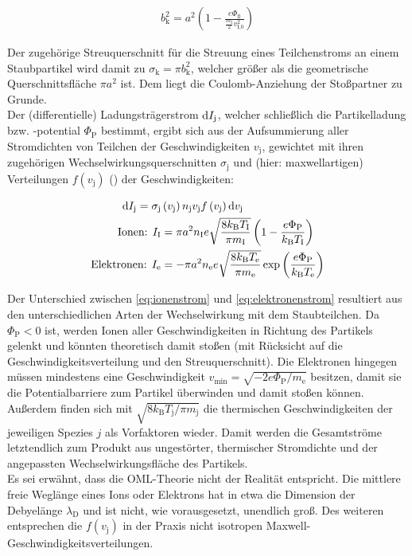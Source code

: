 \documentclass[numbers=noenddot,a4paper,notitlepage,twoside,BCOR15mm]{scrbook}
\newcommand{\diff}{\textnormal{d}}
\newcommand{\ix}[1]{_\text{#1}}
\begin{document}
				\begin{align}
					b\ix{k}^2=a^2\left(1-\frac{e\Phi\ix{fl}}{\frac{m\ix{I}}{2}v\ix{I,0}^2}\right) \label{eq:krit}
				\end{align}

			Der zugehörige Streuquerschnitt für die Streuung eines Teilchenstroms an einem Staubpartikel wird damit zu $\sigma\ix{k}=\pi b\ix{k}^2$, welcher größer als die geometrische Querschnittsfläche $\pi a^2$ ist. Dem liegt die Coulomb-Anziehung der Stoßpartner zu Grunde.\\
			Der (differentielle) Ladungsträgerstrom $\diff I\ix{j}$, welcher schließlich die Partikelladung bzw. -potential $\Phi\ix{P}$ bestimmt, ergibt sich aus der Aufsummierung aller Stromdichten von Teilchen der Geschwindigkeiten $v\ix{j}$, gewichtet mit ihren zugehörigen Wechselwirkungsquerschnitten $\sigma\ix{j}$ und (hier: maxwellartigen) Verteilungen $f\left(v\ix{j}\right)$ (\cite{Melzer12}) der Geschwindigkeiten:

				\begin{align}
					\diff I\ix{j}=\sigma\ix{j}&\left(v\ix{j}\right)n\ix{j}v\ix{j}f\left(v\ix{j}\right)\diff v\ix{j} \nonumber \\
					\text{Ionen: } I\ix{I}&=\pi a^2n\ix{I}e\sqrt{\frac{8k\ix{B}T\ix{I}}{\pi m\ix{I}}}\left(1-\frac{e\Phi\ix{P}}{k\ix{B}T\ix{I}}\right) \label{eq:ionenstrom} \\
					\text{Elektronen: } I\ix{e}&=-\pi a^2n\ix{e}e\sqrt{\frac{8k\ix{B}T\ix{e}}{\pi m\ix{e}}}\exp\left(\frac{e\Phi\ix{P}}{k\ix{B}T\ix{e}}\right) \label{eq:elektronenstrom}
				\end{align}

			Der Unterschied zwischen \autoref{eq:ionenstrom} und \autoref{eq:elektronenstrom} resultiert aus den unterschiedlichen Arten der Wechselwirkung mit dem Staubteilchen. Da $\Phi\ix{P}<0$ ist, werden Ionen aller Geschwindigkeiten in Richtung des Partikels gelenkt und könnten theoretisch damit stoßen (mit Rücksicht auf die Geschwindigkeitsverteilung und den Streuquerschnitt). Die Elektronen hingegen müssen mindestens eine Geschwindigkeit $v\ix{min}=\sqrt{-2e\Phi\ix{P}/m\ix{e}}$ besitzen, damit sie die Potentialbarriere zum Partikel überwinden und damit stoßen können. Au{\ss}erdem finden sich mit $\sqrt{8k\ix{B}T\ix{j}/\pi m\ix{j}}$ die thermischen Geschwindigkeiten der jeweiligen Spezies $j$ als Vorfaktoren wieder. Damit werden die Gesamtstr\"ome letztendlich zum Produkt aus ungest\"orter, thermischer Stromdichte und der angepassten Wechselwirkungsfl\"ache des Partikels. \\
			Es sei erwähnt, dass die OML-Theorie nicht der Realität entspricht. Die mittlere freie Weglänge eines Ions oder Elektrons hat in etwa die Dimension der Debyelänge $\lambda\ix{D}$ und ist nicht, wie vorausgesetzt, unendlich groß. Des weiteren entsprechen die $f\left(v\ix{j}\right)$ in der Praxis nicht isotropen Maxwell-Geschwindigkeitsverteilungen.
\end{document}
